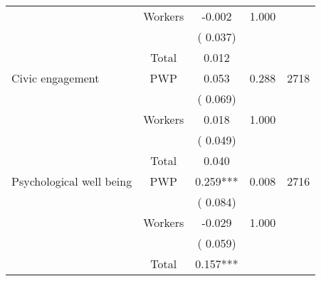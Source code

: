 \begin{tabular}{l*{4}{c}}
                               &       Workers         &             -0.002               &        1.000   &                                               \\ 
                               &                               &       (       0.037)                     & &                                                                             \\ 
\cmidrule{2-3}
                               &       Total           &              0.012               &   &                                               \\ 
\cmidrule{2-3}
 Civic engagement                &       PWP     &              0.053               &        0.288   & 2718                              \\ 
                               &                               &       (       0.069)                     & &                                                                             \\ 
                               &       Workers         &              0.018               &        1.000   &                                               \\ 
                               &                               &       (       0.049)                     & &                                                                             \\ 
\cmidrule{2-3}
                               &       Total           &              0.040               &   &                                               \\ 
\cmidrule{2-3}
 Psychological well being                &       PWP     &              0.259***               &        0.008   & 2716                              \\ 
                               &                               &       (       0.084)                     & &                                                                             \\ 
                               &       Workers         &             -0.029               &        1.000   &                                               \\ 
                               &                               &       (       0.059)                     & &                                                                             \\ 
\cmidrule{2-3}
                               &       Total           &              0.157***               &   &                                               \\ 

\end{tabular}
